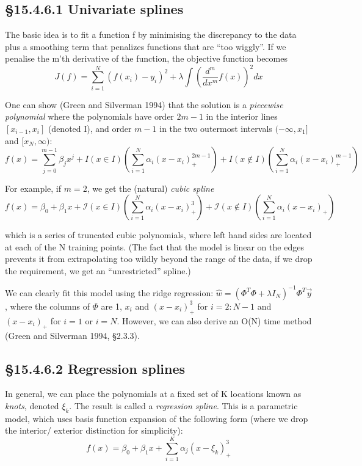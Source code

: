 \documentclass{amsart}
\begin{document}
\subsection{\S 15.4.6.1 Univariate splines}
The basic idea is to fit a function f by minimising the discrepancy to the data plus a
smoothing term that penalizes functions that are ``too wiggly''. If we penalise the
m'th derivative of the function, the objective function becomes
\[
J(f) = \sum_{i=1}^N (f(x_i) - y_i)^2 + \lambda \int \left(\frac{d^m}{dx^m} f(x)\right)^2 dx
\]

One can show (Green and Silverman 1994) that the solution is a \emph{piecewise polynomial}
where the polynomials have order $2m - 1$ in the interior lines $[x_{i-1}, x_i]$ (denoted I),
and order $m - 1$ in the two outermost intervals $(-\infty, x_1]$ and $[x_N, \infty)$:
\[
f(x) = \sum_{j=0}^{m-1} \beta_j x^j + I(x \in I)\left( \sum_{i=1}^N \alpha_i (x - x_i)^{2m - 1}_{+}\right) + I(x \notin I)\left(\sum_{i=1}^N \alpha_i (x - x_i)^{m-1}_{+}\right)
\]

For example, if $m=2$, we get the (natural) \emph{cubic spline}
\[
f(x) = \beta_0 + \beta_1 x + \mathcal{I}(x \in I)\left(\sum_{i=1}^N \alpha_i (x - x_i)^3_+ \right) +
\mathcal{I}(x \notin I) \left( \sum_{i=1}^N \alpha_i (x - x_i)_+ \right)
\]

which is a series of truncated cubic polynomials, where left hand sides are located at
each of the N training points. (The fact that the model is linear on the edges prevents it
from extrapolating too wildly beyond the range of the data, if we drop the requirement,
we get an ``unrestricted'' spline.)

We can clearly fit this model using the ridge regression:
$\hat{w} = (\Phi^T \Phi + \lambda I_N)^{-1} \Phi^T \vec{y}$, where the columns of $\Phi$ are
1, $x_i$ and $(x - x_i)^3_+$ for $i=2:N-1$ and $(x - x_i)_+$ for $i=1$ or $i=N$. However, we
can also derive an O(N) time method (Green and Silverman 1994, \S 2.3.3).

\subsection{\S 15.4.6.2 Regression splines}

In general, we can place the polynomials at a fixed set of K locations known as \emph{knots},
denoted $\xi_k$. The result is called a \emph{regression spline}. This is a parametric model,
which uses basis function expansion of the following form (where we drop the interior/
exterior distinction for simplicity):
\[
f(x) = \beta_0 + \beta_1 x + \sum_{i=1}^K \alpha_j (x - \xi_k)^3_+
\]
\end{document}
